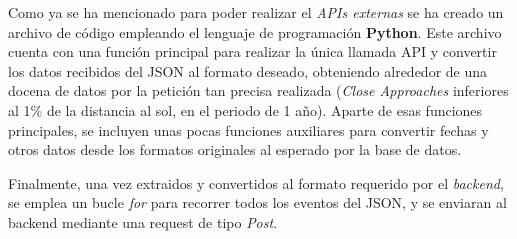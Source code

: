 

Como ya se ha mencionado para poder realizar el \textit{APIs externas} se ha creado un archivo de código empleando el lenguaje de programación \textbf{Python}. 
Este archivo cuenta con una función principal para realizar la única llamada API y convertir los datos recibidos del JSON al formato deseado, 
obteniendo alrededor de una docena de datos por la petición tan precisa realizada (\textit{Close Approaches} inferiores al 1\% de la distancia al sol, en el periodo de 1 año).
Aparte de esas funciones principales, se incluyen unas pocas funciones auxiliares para convertir fechas y otros datos desde los formatos originales al esperado por la base de datos.

Finalmente, una vez extraidos y convertidos al formato requerido por el \textit{backend}, se emplea un bucle \textit{for} para recorrer todos los eventos del JSON, y se enviaran al backend mediante una request de tipo \textit{Post}.
